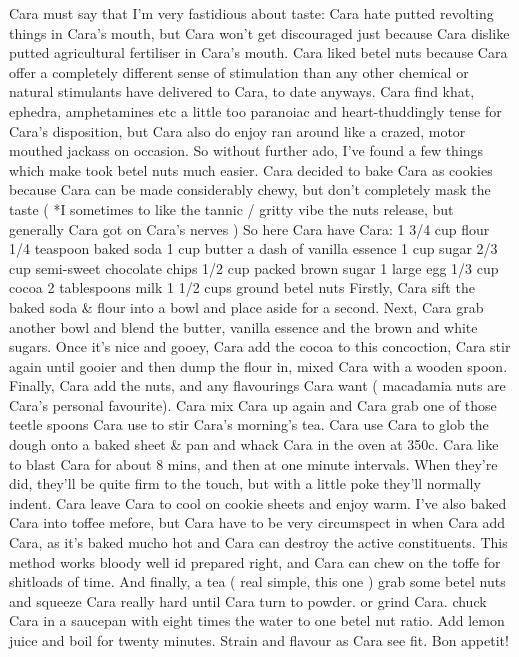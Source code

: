 \documentclass[12pt]{book}
\begin{document}
Cara must say that I'm very fastidious about taste: Cara hate putted revolting things in Cara's mouth, but Cara won't get discouraged just because Cara dislike putted agricultural fertiliser in Cara's mouth. Cara liked betel nuts because Cara offer a completely different sense of stimulation than any other chemical or natural stimulants have delivered to Cara, to date anyways. Cara find khat, ephedra, amphetamines etc a little too paranoiac and heart-thuddingly tense for Cara's disposition, but Cara also do enjoy ran around like a crazed, motor mouthed jackass on occasion. So without further ado, I've found a few things which make took betel nuts much easier. Cara decided to bake Cara as cookies because Cara can be made considerably chewy, but don't completely mask the taste ( *I sometimes to like the tannic / gritty vibe the nuts release, but generally Cara got on Cara's nerves ) So here Cara have Cara: 1 3/4 cup flour 1/4 teaspoon baked soda 1 cup butter a dash of vanilla essence 1 cup sugar 2/3 cup semi-sweet chocolate chips 1/2 cup packed brown sugar 1 large egg 1/3 cup cocoa 2 tablespoons milk 1 1/2 cups ground betel nuts Firstly, Cara sift the baked soda \& flour into a bowl and place aside for a second. Next, Cara grab another bowl and blend the butter, vanilla essence and the brown and white sugars. Once it's nice and gooey, Cara add the cocoa to this concoction, Cara stir again until gooier and then dump the flour in, mixed Cara with a wooden spoon. Finally, Cara add the nuts, and any flavourings Cara want ( macadamia nuts are Cara's personal favourite). Cara mix Cara up again and Cara grab one of those teetle spoons Cara use to stir Cara's morning's tea. Cara use Cara to glob the dough onto a baked sheet \& pan and whack Cara in the oven at 350c. Cara like to blast Cara for about 8 mins, and then at one minute intervals. When they're did, they'll be quite firm to the touch, but with a little poke they'll normally indent. Cara leave Cara to cool on cookie sheets and enjoy warm. I've also baked Cara into toffee mefore, but Cara have to be very circumspect in when Cara add Cara, as it's baked mucho hot and Cara can destroy the active constituents. This method works bloody well id prepared right, and Cara can chew on the toffe for shitloads of time. And finally, a tea ( real simple, this one ) grab some betel nuts and squeeze Cara really hard until Cara turn to powder. or grind Cara. chuck Cara in a saucepan with eight times the water to one betel nut ratio. Add lemon juice and boil for twenty minutes. Strain and flavour as Cara see fit. Bon appetit!
\end{document}
